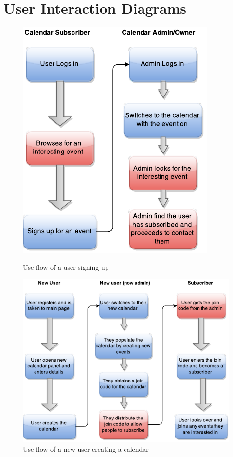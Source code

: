 \documentclass[10pt,a4paper]{article}
\begin{document}
\section{User Interaction Diagrams}
\label{sec:fd}
\begin{figure}[H]
\centering
\begin{minipage}{.4\textwidth}
  \centering
  \includegraphics[width=1\linewidth]{user_event}
  \caption{Use flow of a user signing up}
\end{minipage}%
\begin{minipage}{.7\textwidth}
  \centering
  \includegraphics[width=0.9\linewidth]{calendar_user}
  \caption{Use flow of a new user creating a calendar}
\end{minipage}
\end{figure}
\end{document}
